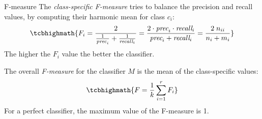 \begin{frame}{F-measure} 
The {\em class-specif\/{i}c
F-measure} tries to balance the precision and recall values, by
computing their harmonic mean for class $c_i$:
\begin{align*}
\tcbhighmath{
  F_i = \frac{2}{\frac{1}{\textit{prec}_i} + \frac{1}{\textit{recall}_i}} =
  \frac{2 \cdot \textit{prec}_i \cdot \textit{recall}_i}{\textit{prec}_i + \textit{recall}_i} =
  \frac{2 \; n_{ii}}{n_{i} + m_{i}}
}
\end{align*}
The higher the $F_i$ value the better the classif\/{i}er.

\medskip
The overall {\em F-measure} for the classif\/{i}er $M$ is the mean of
the class-specif\/{i}c values:
\begin{align*}
\tcbhighmath{
  F = \frac{1}{k} \sum_{i=1}^r F_i
}
\end{align*}
For a perfect classif\/{i}er, the maximum value of the F-measure is 1.
\end{frame}



